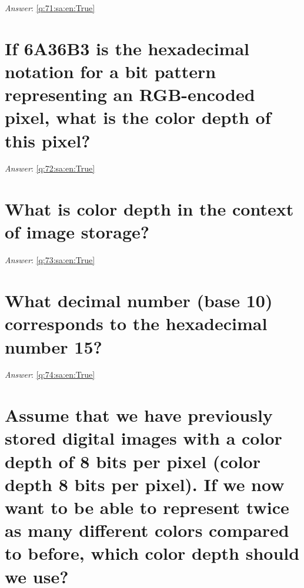 \documentclass[a4paper,11pt,oneside]{book}
\begin{document}
\begin{sloppypar}
\vspace{1cm}

\textit{Answer}: \autoref{q:71:sa:en:True}



\section{If 6A36B3 is the hexadecimal notation for a bit pattern representing an RGB-encoded pixel, what is the color depth of this pixel?}

\label{q:72:sa:en:False}

\vspace{2cm}

\noindent\makebox[\textwidth]{\hrulefill}

\vspace{1cm}

\textit{Answer}: \autoref{q:72:sa:en:True}



\section{What is color depth in the context of image storage?}

\label{q:73:sa:en:False}

\vspace{2cm}

\noindent\makebox[\textwidth]{\hrulefill}

\vspace{1cm}

\textit{Answer}: \autoref{q:73:sa:en:True}



\section{What decimal number (base 10) corresponds to the hexadecimal number 15?}

\label{q:74:sa:en:False}

\vspace{2cm}

\noindent\makebox[\textwidth]{\hrulefill}

\vspace{1cm}

\textit{Answer}: \autoref{q:74:sa:en:True}



\section{Assume that we have previously stored digital images with a color depth of 8 bits per pixel (color depth 8 bits per pixel). If we now want to be able to represent twice as many different colors compared to before, which color depth should we use?}


\end{sloppypar}
\end{document}
